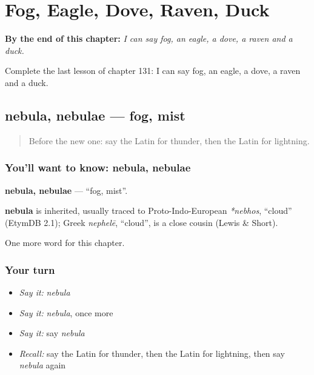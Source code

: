 
\chapter{Fog, Eagle, Dove, Raven, Duck}
\label{ch:la-fog-eagle-dove-raven-duck}

\begin{chapteropening}
\textbf{By the end of this chapter:} \emph{I can say fog, an eagle, a dove, a raven and a duck.}

Complete the last lesson of chapter 131: I can say fog, an eagle, a dove, a raven and a duck.
\end{chapteropening}

\section[nebula, nebulae]{nebula, nebulae — fog, mist}

\label{lesson:LA-C131-nebula}



\begin{quote}
Before the new one: say the Latin for thunder, then the Latin for lightning.
\end{quote}

\subsection*{You'll want to know: nebula, nebulae}
\textbf{nebula, nebulae} — \textquotedblleft{}fog, mist\textquotedblright{}.

\begin{cousinweb}
\textbf{nebula} is inherited, usually traced to Proto-Indo-European \emph{*nebhos}, \textquotedblleft{}cloud\textquotedblright{} (EtymDB 2.1); Greek \emph{nephelē}, \textquotedblleft{}cloud\textquotedblright{}, is a close cousin (Lewis \& Short).
\end{cousinweb}

\begin{grammarlens}[title={What you've built}]
One more word for this chapter.
\end{grammarlens}

\subsection*{Your turn}
\begin{itemize}
\raggedright
  \item \emph{Say it:} \emph{nebula}
  \item \emph{Say it:} \emph{nebula}, once more
  \item \emph{Say it:} say \emph{nebula}
  \item \emph{Recall:} say the Latin for thunder, then the Latin for lightning, then say \emph{nebula} again
\end{itemize}

